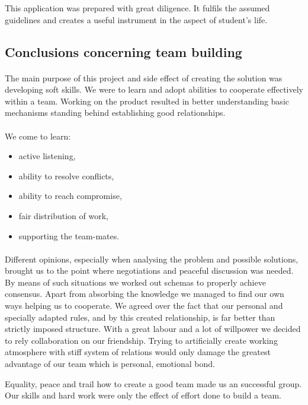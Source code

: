 \documentclass[12pt]{article}
\begin{document}
This application was prepared with great diligence.
It fulfils the assumed guidelines and creates a useful instrument in the aspect of student's life.

\subsection{Conclusions concerning team building}
\paragraph{}
The main purpose of this project and side effect of creating the solution was developing soft skills.
We were to learn and adopt abilities to cooperate effectively within a team.
Working on the product resulted in better understanding basic mechanisms standing behind establishing good relationships.

\paragraph{}
We come to learn:
\begin{itemize}
	\item active listening,
	\item ability to resolve conflicts,
	\item ability to reach compromise,
	\item fair distribution of work,
	\item supporting the team-mates.
\end{itemize}

\paragraph{}
Different opinions, especially when analysing the problem and possible solutions, brought us to the point where negotiations and peaceful discussion was needed.
By means of such situations we worked out schemas to properly achieve consensus.
Apart from absorbing the knowledge we managed to find our own ways helping us to cooperate.
We agreed over the fact that our personal and specially adapted rules, and by this created relationship, is far better than strictly imposed structure.
With a great labour and a lot of willpower we decided to rely collaboration on our friendship.
Trying to artificially create working atmosphere with stiff system of relations would only damage the greatest advantage of our team which is personal, emotional bond.

Equality, peace and trail how to create a good team made us an successful group.
Our skills and hard work were only the effect of effort done to build a team.
\end{document}
